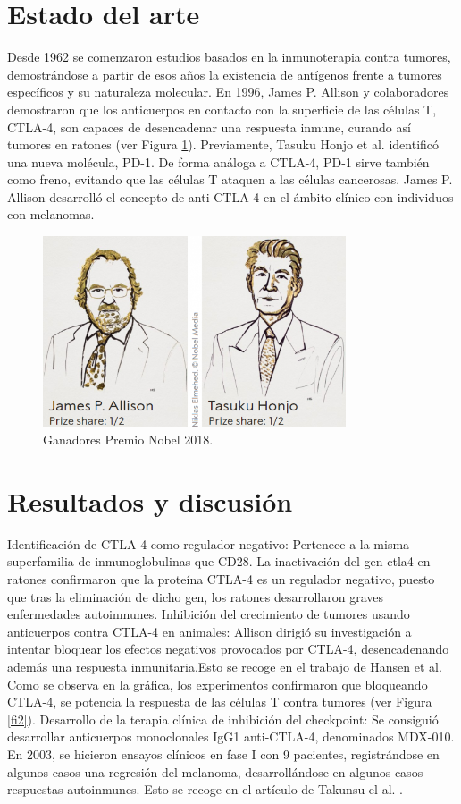 \documentclass[]{article}
\begin{document}
\section{Estado del arte}
Desde 1962 se comenzaron estudios basados en la inmunoterapia contra tumores, demostrándose a partir de esos años la existencia de antígenos frente a tumores específicos y su naturaleza molecular.
En 1996, James P. Allison y colaboradores demostraron que los anticuerpos en contacto con la superficie de las células T, CTLA-4, son capaces de desencadenar una respuesta inmune, curando así tumores en ratones (ver Figura \ref{fi}). 
Previamente, Tasuku Honjo et al. \cite{Dong2003} identificó una nueva molécula, PD-1. De forma análoga a CTLA-4, PD-1 sirve también como freno, evitando que las células T ataquen a las células cancerosas. 
James P. Allison desarrolló el concepto de anti-CTLA-4 en el ámbito clínico con individuos con melanomas. 



\begin{figure}[!h]
	\centering
	\includegraphics[width=0.8\textwidth]{images/caras.png}
	\caption{ Ganadores Premio Nobel 2018. } \label{fi}
\end{figure}

\section{Resultados y discusión}
Identificación de CTLA-4 como regulador negativo: Pertenece a la misma superfamilia de inmunoglobulinas que CD28. La inactivación del gen ctla4 en ratones confirmaron que la proteína CTLA-4 es un regulador negativo, puesto que tras la eliminación de dicho gen, los ratones desarrollaron graves enfermedades autoinmunes.
Inhibición del crecimiento de tumores usando anticuerpos contra CTLA-4 en animales: Allison dirigió su investigación a intentar bloquear los efectos negativos provocados por CTLA-4, desencadenando además una respuesta inmunitaria.Esto se recoge en el trabajo de Hansen et al. \cite{Hansen1980}  Como se observa en la gráfica, los experimentos confirmaron que bloqueando CTLA-4, se potencia la respuesta de las células T  contra tumores (ver Figura \ref{fi2}). 
Desarrollo de la terapia clínica de inhibición del checkpoint: Se consiguió desarrollar anticuerpos monoclonales IgG1 anti-CTLA-4, denominados MDX-010. En 2003, se hicieron ensayos clínicos en fase I con 9 pacientes, registrándose en algunos casos una regresión del melanoma, desarrollándose en algunos casos respuestas autoinmunes. Esto se recoge en el artículo de Takunsu el al. \cite{Tasuku} .  
\end{document}
